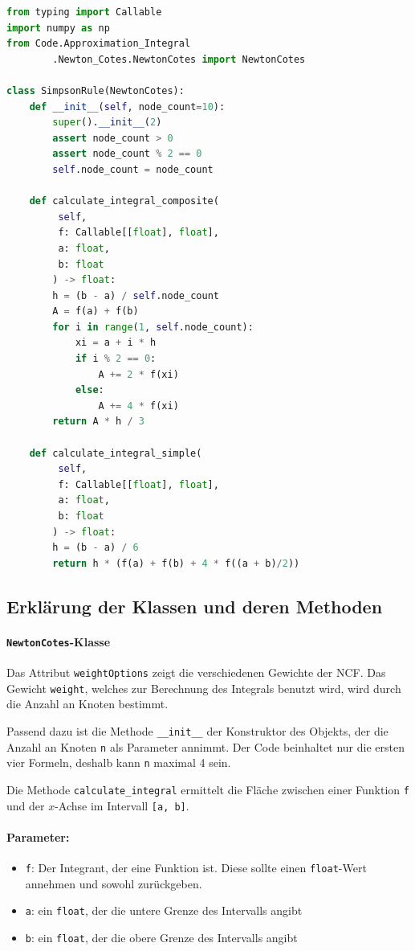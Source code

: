 \begin{lstlisting}[language=Python, caption={Vollständiger Code der SimpsonRule-Klasse}, label={lst:SimpsonRuleClass}]
from typing import Callable
import numpy as np
from Code.Approximation_Integral
        .Newton_Cotes.NewtonCotes import NewtonCotes

class SimpsonRule(NewtonCotes):
    def __init__(self, node_count=10):
        super().__init__(2)
        assert node_count > 0
        assert node_count % 2 == 0
        self.node_count = node_count

    def calculate_integral_composite(
         self,
         f: Callable[[float], float],
         a: float,
         b: float
        ) -> float:
        h = (b - a) / self.node_count
        A = f(a) + f(b)
        for i in range(1, self.node_count):
            xi = a + i * h
            if i % 2 == 0:
                A += 2 * f(xi)
            else:
                A += 4 * f(xi)
        return A * h / 3

    def calculate_integral_simple(
         self,
         f: Callable[[float], float],
         a: float,
         b: float
        ) -> float:
        h = (b - a) / 6
        return h * (f(a) + f(b) + 4 * f((a + b)/2))
\end{lstlisting}

\subsection{Erklärung der Klassen und deren Methoden}

\paragraph{\texttt{NewtonCotes}-Klasse}
Das Attribut \texttt{weightOptions} zeigt die verschiedenen Gewichte der NCF. Das Gewicht \texttt{weight}, welches zur Berechnung des Integrals benutzt wird, wird durch die Anzahl an Knoten bestimmt.

Passend dazu ist die Methode \texttt{\_\_init\_\_} der Konstruktor des Objekts, der die Anzahl an Knoten \texttt{n} als Parameter annimmt. Der Code beinhaltet nur die ersten vier Formeln, deshalb kann \texttt{n} maximal 4 sein.

Die Methode \texttt{calculate\_integral} ermittelt die Fläche zwischen einer Funktion \texttt{f} und der $x$-Achse im Intervall \texttt{[a, b]}.

\paragraph{Parameter:}
\begin{itemize}
    \item \texttt{f}: Der Integrant, der eine Funktion ist. Diese sollte einen \texttt{float}-Wert annehmen und sowohl zurückgeben.
    \item \texttt{a}: ein \texttt{float}, der die untere Grenze des Intervalls angibt
    \item \texttt{b}: ein \texttt{float}, der die obere Grenze des Intervalls angibt
\end{itemize}

